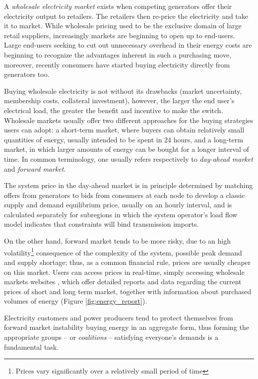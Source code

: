 \documentclass[11pt, twoside, titlepage, a4paper, openright]{report}
\begin{document}
A \textit{wholesale electricity market} exists when competing generators offer their electricity output to retailers. The retailers then re-price the electricity and take it to market. While wholesale pricing used to be the exclusive domain of large retail suppliers, increasingly markets are beginning to open up to end-users. Large end-users seeking to cut out unnecessary overhead in their energy costs are beginning to recognize the advantages inherent in such a purchasing move, moreover, recently consumers have started buying electricity directly from generators too.

Buying wholesale electricity is not without its drawbacks (market uncertainty, membership costs, collateral investment), however, the larger the end user's electrical load, the greater the benefit and incentive to make the switch.
Wholesale markets usually offer two different approaches for the buying strategies users can adopt: a short-term market, where buyers can obtain relatively small quantities of energy, usually intended to be spent in 24 hours, and a long-term market, in which larger amounts of energy can be bought for a longer interval of time. In common terminology, one usually refers respectively to \textit{day-ahead market} and \textit{forward market}.

The system price in the day-ahead market is in principle determined by matching offers from generators to bids from consumers at each node to develop a classic supply and demand equilibrium price, usually on an hourly interval, and is calculated separately for subregions in which the system operator's load flow model indicates that constraints will bind transmission imports.

On the other hand, forward market tends to be more risky, due to an high volatility\footnote{Prices vary significantly over a relatively small period of time} consequence of the complexity of the system, possible peak demand and supply shortage; thus, as a common financial rule, prices are usually cheaper on this market.
Users can access prices in real-time, simply accessing wholesale markets websites \cite{GME}, which offer detailed reports and data regarding the current prices of short and long term market, together with information about purchased volumes of energy (Figure \ref{fig:energy_report}).

\noindent Electricity customers and power producers tend to protect themselves from forward market instability buying energy in an aggregate form, thus forming the appropriate groups -- or \textit{coalitions} -- satisfying everyone's demands is a fundamental task. 
\end{document}
